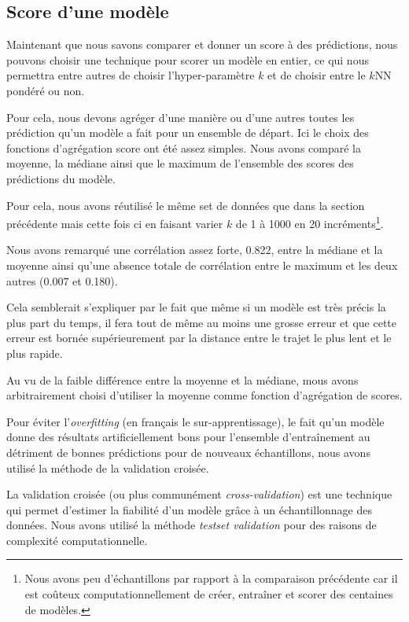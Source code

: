 \documentclass[letterpaper]{article}
\begin{document}
\FloatBarrier
\subsection{Score d'une modèle}

Maintenant que nous savons comparer et donner un score à des prédictions, nous pouvons choisir une technique pour scorer un modèle en entier, ce qui nous permettra entre autres de choisir l'hyper-paramètre $k$ et de choisir entre le $k$NN pondéré ou non.

Pour cela, nous devons agréger d'une manière ou d'une autres toutes les prédiction qu'un modèle a fait pour un ensemble de départ. Ici le choix des fonctions d’agrégation score ont été assez simples. Nous avons comparé la moyenne, la médiane ainsi que le maximum de l'ensemble des scores des prédictions du modèle.

Pour cela, nous avons réutilisé le même set de données que dans la section précédente mais cette fois ci en faisant varier $k$ de 1 à 1000 en 20 incréments\footnote{Nous avons peu d’échantillons par rapport à la comparaison précédente car il est coûteux computationnellement de créer, entraîner et scorer des centaines de modèles.}.

Nous avons remarqué une corrélation assez forte, 0.822, entre la médiane et la moyenne ainsi qu'une absence totale de corrélation entre le maximum et les deux autres (0.007 et 0.180).

Cela semblerait s'expliquer par le fait que même si un modèle est très précis la plus part du temps, il fera tout de même au moins une grosse erreur et que cette erreur est bornée supérieurement par la distance entre le trajet le plus lent et le plus rapide.

Au vu de la faible différence entre la moyenne et la médiane, mous avons arbitrairement choisi d'utiliser la moyenne comme fonction d'agrégation de scores.

Pour éviter l'\textit{overfitting} (en français le sur-apprentissage), le fait qu'un modèle donne des résultats artificiellement bons pour l'ensemble d’entraînement au détriment de bonnes prédictions pour de nouveaux échantillons, nous avons utilisé la méthode de la validation croisée.

La validation croisée (ou plus communément \textit{cross-validation}) est une technique qui permet d'estimer la fiabilité d'un modèle grâce à un échantillonnage des données. Nous avons utilisé la méthode \textit{testset validation} pour des raisons de complexité computationnelle.
\end{document}

